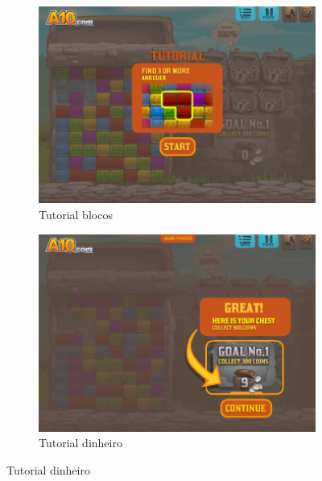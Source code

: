 \documentclass[12pt]{article}
\begin{document}
\begin{figure}[h]
\begin{subfigure}{0.5\textwidth}
\includegraphics[scale=0.3]{imagens/tutorialblocos.png}
\caption{Tutorial blocos}
\label{fig:tutorialblocos}
\end{subfigure}
\begin{subfigure}{0.5\textwidth}
\includegraphics[scale=0.3]{imagens/tutorialdinheiro.png} 
\caption{Tutorial dinheiro}
\label{fig:tutorialdinheiro}
\end{subfigure}
\end{figure}
\end{document}
